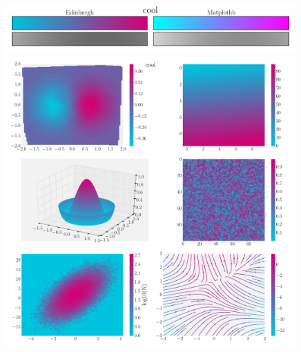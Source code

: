 \documentclass[10pt,a4paper]{article}
\begin{document}
\newpage
\begin{figure}[ht]
  \centering
  \includegraphics[width=0.99\textwidth]{coolBars.pdf}
  \includegraphics[width=0.99\textwidth]{coolExamples.pdf}
\end{figure}
\end{document}
